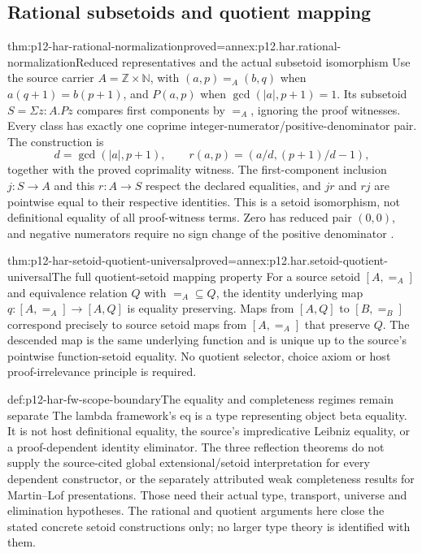 \subsection{Rational subsetoids and quotient mapping}

\begin{hbtheorem}{thm:p12-har-rational-normalization}{proved=annex:p12.har.rational-normalization}{Reduced representatives and the actual subsetoid isomorphism}
Use the source carrier \(A=\mathbb Z\times\mathbb N\), with
\((a,p)=_A(b,q)\) when \(a(q+1)=b(p+1)\), and
\(P(a,p)\) when \(\gcd(|a|,p+1)=1\). Its subsetoid
\(S=\Sigma z:A.Pz\) compares first components by \(=_A\),
ignoring the proof witnesses. Every class has exactly one coprime
integer-numerator/positive-denominator pair. The construction is
\[
 d=\gcd(|a|,p+1),\qquad
 r(a,p)=\left(a/d,(p+1)/d-1\right),
\]
together with the proved coprimality witness. The first-component
inclusion \(j:S\to A\) and this \(r:A\to S\) respect the
declared equalities, and \(jr\) and \(rj\) are pointwise equal
to their respective identities. This is a setoid isomorphism, not
definitional equality of all proof-witness terms. Zero has reduced pair
\((0,0)\), and negative numerators require no sign change of the
positive denominator \cite[p.~1173]{BarendregtGeuvers2001}.
\end{hbtheorem}

\begin{hbtheorem}{thm:p12-har-setoid-quotient-universal}{proved=annex:p12.har.setoid-quotient-universal}{The full quotient-setoid mapping property}
For a source setoid \([A,=_A]\) and equivalence relation \(Q\)
with \(=_A\subseteq Q\), the identity underlying map
\(q:[A,=_A]\to[A,Q]\) is equality preserving. Maps from
\([A,Q]\) to \([B,=_B]\) correspond precisely to source
setoid maps from \([A,=_A]\) that preserve \(Q\).
The descended map is the same underlying function and is unique up to
the source's pointwise function-setoid equality. No quotient selector,
choice axiom or host proof-irrelevance principle is required.
\end{hbtheorem}

\begin{proofboundary}{def:p12-har-fw-scope-boundary}{The equality and completeness regimes remain separate}
The lambda framework's \(\mathrm{eq}\) is a type representing
object beta equality. It is not host definitional equality, the
source's impredicative Leibniz equality, or a proof-dependent identity
eliminator. The three reflection theorems do not supply the source-cited
global extensional/setoid interpretation for every dependent constructor,
or the separately attributed weak completeness results for Martin--Lof
presentations. Those need their actual type, transport, universe and
elimination hypotheses. The rational and quotient arguments here close
the stated concrete setoid constructions only; no larger type theory
is identified with them.
\end{proofboundary}

